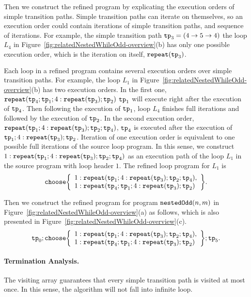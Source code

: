 Then we construct the refined program by explicating the execution orders of simple transition paths.
Simple transition paths can iterate on themselves, so an execution order could
contain iterations of simple transition paths, and sequence of iterations.
For example, the simple transition path $\mathtt{tp}_3 = (4 \to 5 \to 4)$
the loop $L_4$ in Figure~\ref{fig:relatedNestedWhileOdd-overview}(b) has only one possible execution order,
which is the iteration on itself, $\mathtt{repeat}(\mathtt{tp}_3)$.

Each loop in a refined program contains several execution orders over simple transition paths.
For example, the loop $L_1$ in Figure~\ref{fig:relatedNestedWhileOdd-overview}(b)
has two execution orders. In the first one,
$\mathtt{repeat}(\mathtt{tp}_4; \mathtt{tp}_1; 4:\mathtt{repeat}(\mathtt{tp}_3); \mathtt{tp}_2)$ 
$\mathtt{tp}_1$ will execute right after the execution of $\mathtt{tp}_4$.
Then following the execution of $\mathtt{tp}_1$, loop $L_4$ finishes full iterations and followed by the execution of $\mathtt{tp}_2$.
In the second execution order,
$\mathtt{repeat}(\mathtt{tp}_1; 4:\mathtt{repeat}(\mathtt{tp}_3); \mathtt{tp}_2; \mathtt{tp}_4)$,
$\mathtt{tp}_4$ is executed after the execution of $\mathtt{tp}_1; 4:\mathtt{repeat}(\mathtt{tp}_3); \mathtt{tp}_2$.
Iteration of one execution order is equivalent to one possible full iterations of the source loop program.
In this sense, we construct $1: \mathtt{repeat}(\mathtt{tp}_1; 4:\mathtt{repeat}(\mathtt{tp}_3); \mathtt{tp}_2; \mathtt{tp}_4)$ as an execution path of the loop $L_1$ in the source program with loop header $1$.
The refined loop program for $L_1$ is 
\[
\rpchoose{ 
 \begin{array}{l}
 1: \rprepeat(\tpath_1; 4:\rprepeat(\tpath_3); \tpath_2; \tpath_4), \\
 1: \rprepeat(\tpath_4; \tpath_1; 4:\rprepeat(\tpath_3); \tpath_2) 
 \end{array}
 }.
\]

Then we construct the refined program for program $\mathtt{nestedOdd}(n, m)$ in Figure~\ref{fig:relatedNestedWhileOdd-overview}(a) as follows, which is also presented in Figure~\ref{fig:relatedNestedWhileOdd-overview}(c).
\[
 \tpath_0 ; \rpchoose{ 
 \begin{array}{l}
    1: \rprepeat(\tpath_1; 4:\rprepeat(\tpath_3); \tpath_2; \tpath_4), \\
    1: \rprepeat(\tpath_4; \tpath_1; 4:\rprepeat(\tpath_3); \tpath_2) 
 \end{array}
 }; \tpath_5.
\]


\paragraph{Termination Analysis.}
The visiting array guarantees that every simple transition path is visited at most once.
In this sense, the algorithm will not fall into infinite loop.



